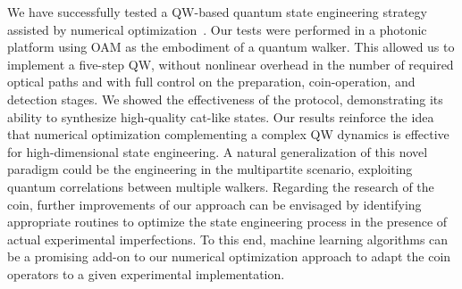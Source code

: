 We have successfully tested a QW-based quantum state engineering strategy assisted by numerical optimization~\cite{innocenti2017quantum}. Our tests were performed in a photonic platform using OAM as the embodiment of a quantum walker. This allowed us to implement a five-step QW, without nonlinear overhead in the number of required optical paths and with full control on the preparation, coin-operation, and detection stages. We showed the effectiveness of the protocol, demonstrating its ability to synthesize high-quality cat-like states. Our results reinforce the idea that numerical optimization complementing a complex QW dynamics is effective for high-dimensional state engineering. A natural generalization of this novel paradigm could be the engineering in the multipartite scenario, exploiting quantum correlations between multiple walkers. Regarding the research of the coin, further improvements of our approach can be envisaged by identifying appropriate routines to optimize the state engineering process in the presence of actual experimental imperfections. To this end, machine learning algorithms can be a promising add-on to our numerical optimization approach to adapt the coin operators to a given experimental implementation.



\label{sec:expQWs:conclusions}

